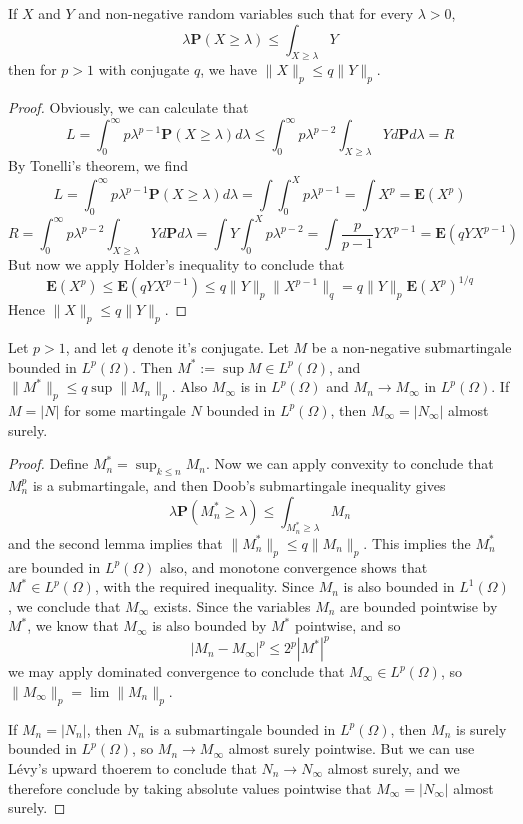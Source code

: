 \begin{lemma}
    If $X$ and $Y$ and non-negative random variables such that for every $\lambda > 0$,
    \[ \lambda \mathbf{P}(X \geq \lambda) \leq \int_{X \geq \lambda} Y \]
    then for $p > 1$ with conjugate $q$, we have $\| X \|_p \leq q \|Y \|_p$.
\end{lemma}
\begin{proof}
    Obviously, we can calculate that
    \[ L = \int_0^\infty p\lambda^{p-1} \mathbf{P}(X \geq \lambda)d\lambda \leq \int_0^\infty p\lambda^{p-2} \int_{X \geq \lambda} Y d\mathbf{P} d\lambda = R \]
    By Tonelli's theorem, we find
    \[ L = \int_0^\infty p\lambda^{p-1} \mathbf{P}(X \geq \lambda) d\lambda = \int \int_0^X p\lambda^{p-1} = \int X^p = \mathbf{E}(X^p) \]
    \[ R = \int_0^\infty p\lambda^{p-2} \int_{X \geq \lambda} Yd\mathbf{P} d\lambda = \int Y \int_0^X p\lambda^{p-2} = \int \frac{p}{p-1} YX^{p-1} = \mathbf{E}(qYX^{p-1}) \]
    But now we apply Holder's inequality to conclude that
    \[ \mathbf{E}(X^p) \leq \mathbf{E}(qYX^{p-1}) \leq q \| Y \|_p \| X^{p-1} \|_q = q \| Y \|_p \mathbf{E}(X^p)^{1/q} \]
    Hence $\|X\|_p \leq q\|Y\|_p$.
\end{proof}

\begin{theorem}
    Let $p > 1$, and let $q$ denote it's conjugate. Let $M$ be a non-negative submartingale bounded in $L^p(\Omega)$. Then $M^* := \sup M \in L^p(\Omega)$, and $\| M^* \|_p \leq q \sup \| M_n \|_p$. Also $M_\infty$ is in $L^p(\Omega)$ and $M_n \to M_\infty$ in $L^p(\Omega)$. If $M = |N|$ for some martingale $N$ bounded in $L^p(\Omega)$, then $M_\infty = |N_\infty|$ almost surely.
\end{theorem}
\begin{proof}
    Define $M_n^* = \sup_{k \leq n} M_n$. Now we can apply convexity to conclude that $M_n^p$ is a submartingale, and then Doob's submartingale inequality gives
    \[ \lambda \mathbf{P}(M_n^* \geq \lambda) \leq \int_{M_n^* \geq \lambda} M_n \]
    and the second lemma implies that $\| M_n^* \|_p \leq q \|M_n\|_p$. This implies the $M_n^*$ are bounded in $L^p(\Omega)$ also, and monotone convergence shows that $M^* \in L^p(\Omega)$, with the required inequality. Since $M_n$ is also bounded in $L^1(\Omega)$, we conclude that $M_\infty$ exists. Since the variables $M_n$ are bounded pointwise by $M^*$, we know that $M_\infty$ is also bounded by $M^*$ pointwise, and so
    \[ |M_n - M_\infty|^p \leq 2^p|M^*|^p \]
    we may apply dominated convergence to conclude that $M_\infty \in L^p(\Omega)$, so $\| M_\infty \|_p = \lim \| M_n \|_p$.

    If $M_n = |N_n|$, then $N_n$ is a submartingale bounded in $L^p(\Omega)$, then $M_n$ is surely bounded in $L^p(\Omega)$, so $M_n \to M_\infty$ almost surely pointwise. But we can use L\'{e}vy's upward thoerem to conclude that $N_n \to N_\infty$ almost surely, and we therefore conclude by taking absolute values pointwise that $M_\infty = |N_\infty|$ almost surely.
\end{proof}

